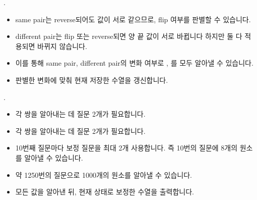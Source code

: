 \begin{frame}{\probno{}. \probtitle{}}
    \begin{itemize}
        \item same pair는 reverse되어도 값이 서로 같으므로, flip 여부를 판별할 수 있습니다.
        \item different pair는 flip 또는 reverse되면 양 끝 값이 서로 바뀝니다 하지만 둘 다 적용되면 바뀌지 않습니다.
        \item 이를 통해 same pair, different pair의 변화 여부로 , 를 모두 알아낼 수 있습니다.
        \item 판별한 변화에 맞춰 현재 저장한 수열을 갱신합니다.
    \end{itemize}
\end{frame}

\begin{frame}{\probno{}. \probtitle{}}
    \begin{itemize}
        \item 각 쌍을 알아내는 데 질문 2개가 필요합니다.
        \item 각 쌍을 알아내는 데 질문 2개가 필요합니다.
        \item 10번째 질문마다 보정 질문을 최대 2개 사용합니다. 즉 10번의 질문에 8개의 원소를 알아낼 수 있습니다.
        \item 약 1250번의 질문으로 1000개의 원소를 알아낼 수 있습니다. 
        \item 모든 값을 알아낸 뒤, 현재 상태로 보정한 수열을 출력합니다.
    \end{itemize}
\end{frame}
